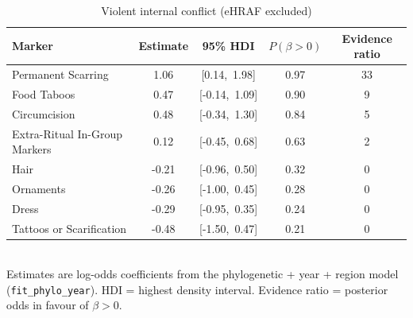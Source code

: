\begin{table}[ht]
\centering
\caption{Violent internal conflict (eHRAF excluded)}
\begin{tabular}{lcccc}
\toprule
Marker & Estimate & 95\% HDI & $P(\beta > 0)$ & Evidence ratio \\
\midrule
Permanent Scarring & 1.06 & [0.14,\ 1.98] & 0.97 & 33 \\
Food Taboos & 0.47 & [-0.14,\ 1.09] & 0.90 & 9 \\
Circumcision & 0.48 & [-0.34,\ 1.30] & 0.84 & 5 \\
Extra-Ritual In-Group Markers & 0.12 & [-0.45,\ 0.68] & 0.63 & 2 \\
Hair & -0.21 & [-0.96,\ 0.50] & 0.32 & 0 \\
Ornaments & -0.26 & [-1.00,\ 0.45] & 0.28 & 0 \\
Dress & -0.29 & [-0.95,\ 0.35] & 0.24 & 0 \\
Tattoos or Scarification & -0.48 & [-1.50,\ 0.47] & 0.21 & 0 \\
\bottomrule
\end{tabular}
\\[4pt]\small Estimates are log-odds coefficients from the phylogenetic + year + region model (\texttt{fit\_phylo\_year}). HDI = highest density interval. Evidence ratio = posterior odds in favour of $\beta > 0$.
\end{table}